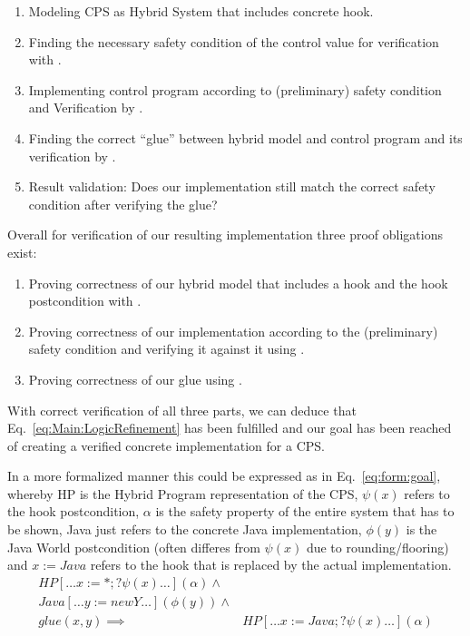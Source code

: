 \begin{enumerate}
	\item Modeling CPS as Hybrid System that includes concrete hook.
	\item Finding the necessary safety condition of the control value for verification with \keym.
	\item Implementing control program according to (preliminary) safety condition and Verification by \key.		
	\item Finding the correct ``glue'' between hybrid model and control program and its verification by \keym.
	\item Result validation: Does our implementation still match the correct safety condition after verifying the glue?
\end{enumerate}

Overall for verification of our resulting implementation three proof obligations exist:
\begin{enumerate}[label=\roman*]
	\item Proving correctness of our hybrid model that includes a hook and the hook postcondition with \keym.
	\item Proving correctness of our implementation according to the (preliminary) safety condition and verifying it against it using \key.
	\item Proving correctness of our glue using \keym.
\end{enumerate} 

With correct verification of all three parts, we can deduce that Eq.~\ref{eq:Main:LogicRefinement} has been fulfilled and our goal has been reached of creating a verified concrete implementation for a CPS.

In a more formalized manner this could be expressed as in Eq.~\ref{eq:form:goal}, whereby HP is the Hybrid Program representation of the CPS, \(\psi(x)\) refers to the hook postcondition, \(\alpha\) is the safety property of the entire system that has to be shown, Java just refers to the concrete Java implementation, \(\phi(y)\) is the Java World postcondition (often differes from \(\psi(x)\) due to rounding/flooring) and \(x:=Java\) refers to the hook that is replaced by the actual implementation.
\begin{equation}
	\begin{split}
		HP[\dots x:=*; ?\psi(x) \dots](\alpha) {}\wedge{}& \\ Java[\dots y:=newY \dots](\phi(y)) \wedge{}& \\ glue(x,y) \implies{}& HP[\dots x:= Java; ?\psi(x)\dots](\alpha)
	\end{split}
\label{eq:form:goal}
\end{equation}

